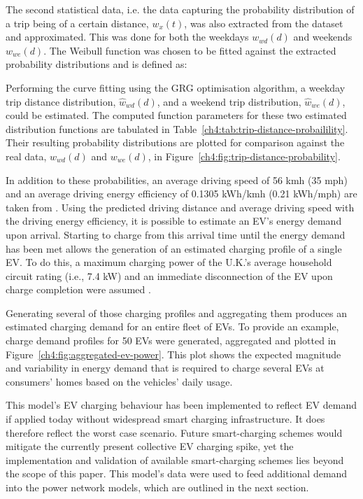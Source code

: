 The second statistical data, i.e. the data capturing the probability distribution of a trip being of a certain distance, $w_x(t)$, was also extracted from the dataset and approximated.
This was done for both the weekdays $w_{wd}(d)$ and weekends $w_{we}(d)$.
The Weibull function was chosen to be fitted against the extracted probability distributions and is defined as:



Performing the curve fitting using the GRG optimisation algorithm, a weekday trip distance distribution, $\hat{w}_{wd}(d)$, and a weekend trip distribution, $\hat{w}_{we}(d)$, could be estimated.
The computed function parameters for these two estimated distribution functions are tabulated in Table~\ref{ch4:tab:trip-distance-probailility}.
Their resulting probability distributions are plotted for comparison against the real data, $w_{wd}(d)$ and $w_{we}(d)$, in Figure~\ref{ch4:fig:trip-distance-probability}.




 
In addition to these probabilities, an average driving speed of 56 kmh (35 mph) and an average driving energy efficiency of 0.1305 kWh/kmh (0.21 kWh/mph) are taken from \cite{UKGovernmentDigitalService2013}.
Using the predicted driving distance and average driving speed with the driving energy efficiency, it is possible to estimate an EV's energy demand upon arrival.
Starting to charge from this arrival time until the energy demand has been met allows the generation of an estimated charging profile of a single EV.
To do this, a maximum charging power of the U.K.'s average household circuit rating (i.e., 7.4 kW) and an immediate disconnection of the EV upon charge completion were assumed \cite{EVHomeCharging}.

Generating several of those charging profiles and aggregating them produces an estimated charging demand for an entire fleet of EVs.
To provide an example, charge demand profiles for 50 EVs were generated, aggregated and plotted in Figure~\ref{ch4:fig:aggregated-ev-power}.
This plot shows the expected magnitude and variability in energy demand that is required to charge several EVs at consumers' homes based on the vehicles' daily usage.

This model's EV charging behaviour has been implemented to reflect EV demand if applied today without widespread smart charging infrastructure. It does therefore reflect the worst case scenario. Future smart-charging schemes would mitigate the currently present collective EV charging spike, yet the implementation and validation of available smart-charging schemes lies beyond the scope of this paper. This model's data were used to feed additional demand into the power network models, which are outlined in the next section.

